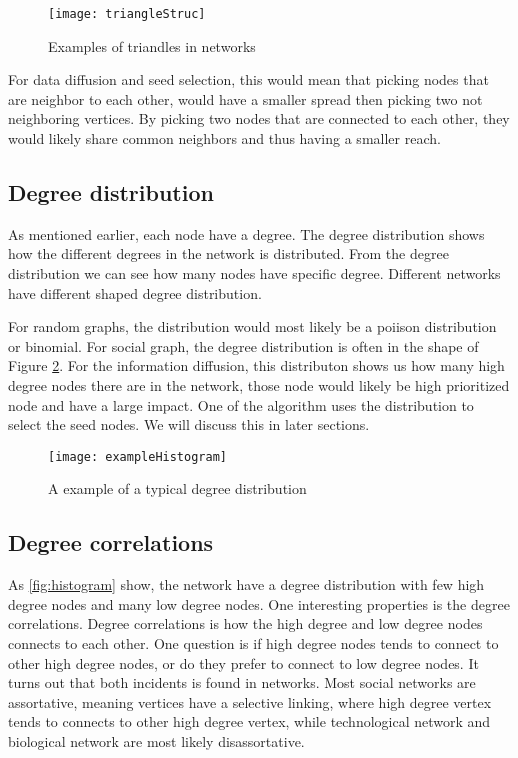 \begin{figure}
	\texttt{[image: triangleStruc]}
	\caption{Examples of triandles in networks} 
	\label{fig:triangleStruc}
\end{figure}


For data diffusion and seed selection, this would mean that picking nodes that are neighbor to each other, would have a smaller spread then picking two not neighboring vertices. By picking two nodes that are connected to each other, they would likely share common neighbors and thus having a smaller reach.  

\subsection{Degree distribution}
As mentioned earlier, each node have a degree. The degree distribution shows how the different degrees in the network is distributed. From the degree distribution we can see how many nodes have specific degree. Different networks have different shaped degree distribution.

For random graphs, the distribution would most likely be a poiison distribution or binomial. For social graph, the degree distribution is often in the shape of Figure \ref{fig:exampleHistogram}. For the information diffusion, this distributon shows us how many high degree nodes there are in the network, those node would likely be high prioritized node and have a large impact. One of the algorithm uses the distribution to select the seed nodes. We will discuss this in later sections.  


\begin{figure}
	\texttt{[image: exampleHistogram]}
	\caption{A example of a typical degree distribution} 
	\label{fig:exampleHistogram}
\end{figure}


\subsection{Degree correlations}
As \ref{fig:histogram} show, the network have a degree distribution with few high degree nodes and many low degree nodes. One interesting properties is the degree correlations. Degree correlations is how the high degree and low degree nodes connects to each other. One question is if high degree nodes tends to connect to other high degree nodes, or do they prefer to connect to low degree nodes. It turns out that both incidents is found in networks\cite{complexNetwork}. Most social networks are assortative, meaning vertices have a selective linking, where high degree vertex tends to connects to other high degree vertex, while technological network and biological network are most likely disassortative\cite{AssortativeMixing2002}. 

